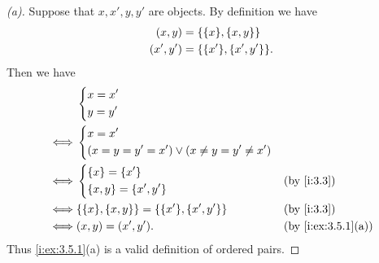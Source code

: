 \begin{proof}[(a)]
  Suppose that \(x, x', y, y'\) are objects.
  By definition we have
  \begin{align*}
    (x, y)   & = \set{\set{x}, \set{x, y}}     \\
    (x', y') & = \set{\set{x'}, \set{x', y'}}.
  \end{align*}
  Then we have
  \begin{align*}
         & \begin{dcases}
             x = x' \\
             y = y'
           \end{dcases}                                                                    \\
    \iff & \begin{dcases}
             x = x' \\
             \pa{x = y = y' = x'} \lor \pa{x \neq y = y' \neq x'}
           \end{dcases}                              \\
    \iff & \begin{dcases}
             \set{x} = \set{x'} \\
             \set{x, y} = \set{x', y'}
           \end{dcases}                                &  & \by{i:3.3}                      \\
    \iff & \set{\set{x}, \set{x, y}} = \set{\set{x'}, \set{x', y'}} &  & \by{i:3.3}         \\
    \iff & (x, y) = (x', y').                                       &  & \by{i:ex:3.5.1}[a]
  \end{align*}
  Thus \cref{i:ex:3.5.1}(a) is a valid definition of ordered pairs.
\end{proof}

